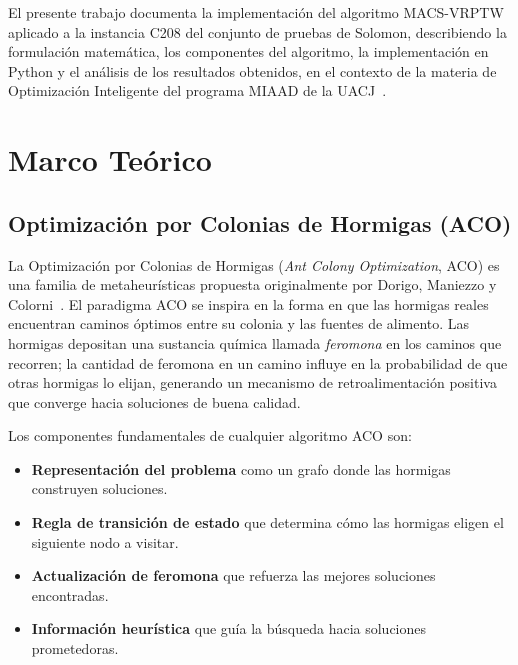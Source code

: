 \documentclass[12pt, letterpaper]{article}
\begin{document}
El presente trabajo documenta la implementación del algoritmo MACS-VRPTW aplicado a la instancia C208 del conjunto de pruebas de Solomon, describiendo la formulación matemática, los componentes del algoritmo, la implementación en Python y el análisis de los resultados obtenidos, en el contexto de la materia de Optimización Inteligente del programa MIAAD de la UACJ~\cite{porras2026material, porras2026actividad}.

\newpage
\section{Marco Teórico}
\label{sec:marco_teorico}

\subsection{Optimización por Colonias de Hormigas (ACO)}
\label{subsec:aco}

La Optimización por Colonias de Hormigas (\textit{Ant Colony Optimization}, ACO) es una familia de metaheurísticas propuesta originalmente por Dorigo, Maniezzo y Colorni~\cite{dorigo1996}. El paradigma ACO se inspira en la forma en que las hormigas reales encuentran caminos óptimos entre su colonia y las fuentes de alimento. Las hormigas depositan una sustancia química llamada \textit{feromona} en los caminos que recorren; la cantidad de feromona en un camino influye en la probabilidad de que otras hormigas lo elijan, generando un mecanismo de retroalimentación positiva que converge hacia soluciones de buena calidad.

Los componentes fundamentales de cualquier algoritmo ACO son:
\begin{itemize}[leftmargin=2cm]
  \item \textbf{Representación del problema} como un grafo donde las hormigas construyen soluciones.
  \item \textbf{Regla de transición de estado} que determina cómo las hormigas eligen el siguiente nodo a visitar.
  \item \textbf{Actualización de feromona} que refuerza las mejores soluciones encontradas.
  \item \textbf{Información heurística} que guía la búsqueda hacia soluciones prometedoras.
\end{itemize}
\end{document}
